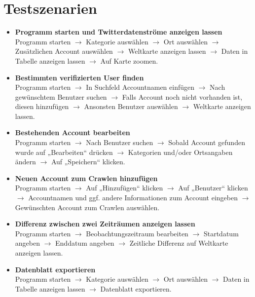 \section{Testszenarien}
\begin{itemize}
	\item \textbf{Programm starten und Twitterdatenströme anzeigen lassen}\\
Programm starten $\rightarrow$ Kategorie auswählen $\rightarrow$ Ort auswählen $\rightarrow$ Zusätzlichen Account auswählen $\rightarrow$ Weltkarte anzeigen lassen $\rightarrow$ Daten in Tabelle anzeigen lassen $\rightarrow$ Auf Karte zoomen. 

	\item \textbf{Bestimmten verifizierten User finden }\\
Programm starten $\rightarrow$ In Suchfeld Accountnamen einfügen $\rightarrow$ Nach gewünschtem Benutzer suchen $\rightarrow$ Falls Account noch nicht vorhanden ist, diesen hinzufügen $\rightarrow$ Ansonsten Benutzer auswählen $\rightarrow$ Weltkarte anzeigen lassen.

	\item \textbf{Bestehenden Account bearbeiten}\\
Programm starten $\rightarrow$ Nach Benutzer suchen $\rightarrow$ Sobald Account gefunden wurde auf „Bearbeiten“ drücken $\rightarrow$ Kategorien und/oder Ortsangaben ändern $\rightarrow$ Auf „Speichern“ klicken.

	\item \textbf{Neuen Account zum Crawlen hinzufügen}\\
Programm starten $\rightarrow$ Auf „Hinzufügen“ klicken $\rightarrow$ Auf „Benutzer“ klicken $\rightarrow$ Accountnamen und ggf. andere Informationen zum Account eingeben $\rightarrow$ Gewünschten Account zum Crawlen auswählen.

	\item \textbf{Differenz zwischen zwei Zeiträumen anzeigen lassen}\\
Programm starten $\rightarrow$ Beobachtungszeitraum bearbeiten $\rightarrow$ Startdatum angeben $\rightarrow$ Enddatum angeben  $\rightarrow$ Zeitliche Differenz auf Weltkarte anzeigen lassen.

\item \textbf{Datenblatt exportieren}\\
Programm starten $\rightarrow$ Kategorie auswählen $\rightarrow$ Ort auswählen $\rightarrow$ Daten in Tabelle anzeigen lassen $\rightarrow$ Datenblatt exportieren.

\end{itemize}